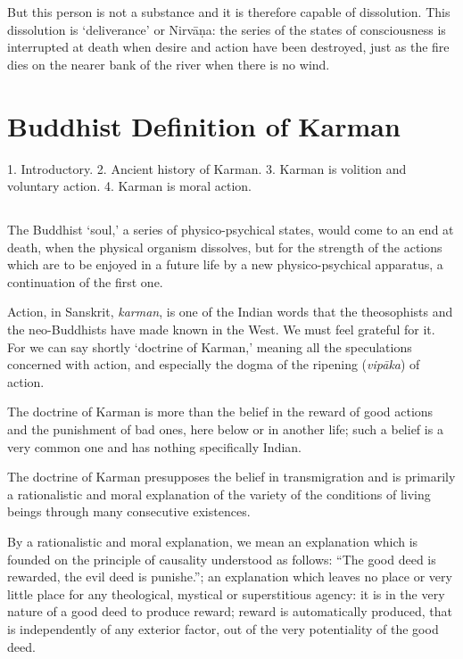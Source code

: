 \documentclass[a4paper, 11pt, oneside, english, landscape]{article}
\begin{document}
But this person is not a substance and it is therefore capable of dissolution. This dissolution is `deliverance' or Nirvāṇa: the series of the states of consciousness is interrupted at death when desire and action have been destroyed, just as the fire dies on the nearer bank of the river when there is no wind.
\clearpage
\section{Buddhist Definition of Karman}
\begin{center}\footnotesize
1. Introductory. 2. Ancient history of Karman. 3. Karman is volition and voluntary action. 4. Karman is moral action.
\end{center}
\subsection{}
\paragraph{}
The Buddhist `soul,' a series of physico-psychical states, would come to an end at death, when the physical organism dissolves, but for the strength of the actions which are to be enjoyed in a future life by a new physico-psychical apparatus, a continuation of the first one.

Action, in Sanskrit, \emph{karman}, is one of the Indian words that the theosophists and the neo-Buddhists have made known in the West. We must feel grateful for it. For we can say shortly `doctrine of Karman,' meaning all the speculations concerned with action, and especially the dogma of the ripening (\emph{vipāka}) of action.

The doctrine of Karman is more than the belief in the reward of good actions and the punishment of bad ones, here below or in another life; such a belief is a very common one and has nothing specifically Indian.

The doctrine of Karman presupposes the belief in transmigration and is primarily a rationalistic and moral explanation of the variety of the conditions of living beings through many consecutive existences.

By a rationalistic and moral explanation, we mean an explanation which is founded on the principle of causality understood as follows: ``The good deed is rewarded, the evil deed is punishe.''; an explanation which leaves no place or very little place for any theological, mystical or superstitious agency: it is in the very nature of a good deed to produce reward; reward is automatically produced, that is independently of any exterior factor, out of the very potentiality of the good deed.
\end{document}
